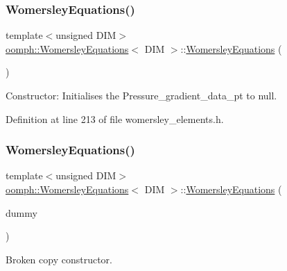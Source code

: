 \subsubsection{\texorpdfstring{Womersley\+Equations()}{WomersleyEquations()}\hspace{0.1cm}{\footnotesize\ttfamily [1/2]}}
{\footnotesize\ttfamily template$<$unsigned D\+IM$>$ \\
\hyperlink{classoomph_1_1WomersleyEquations}{oomph\+::\+Womersley\+Equations}$<$ D\+IM $>$\+::\hyperlink{classoomph_1_1WomersleyEquations}{Womersley\+Equations} (\begin{DoxyParamCaption}{ }\end{DoxyParamCaption})\hspace{0.3cm}{\ttfamily [inline]}}



Constructor\+: Initialises the Pressure\+\_\+gradient\+\_\+data\+\_\+pt to null. 



Definition at line 213 of file womersley\+\_\+elements.\+h.

\mbox{\label{classoomph_1_1WomersleyEquations_aed4568c1736e6027eb111d090b4cb5e9}} 
\subsubsection{\texorpdfstring{Womersley\+Equations()}{WomersleyEquations()}\hspace{0.1cm}{\footnotesize\ttfamily [2/2]}}
{\footnotesize\ttfamily template$<$unsigned D\+IM$>$ \\
\hyperlink{classoomph_1_1WomersleyEquations}{oomph\+::\+Womersley\+Equations}$<$ D\+IM $>$\+::\hyperlink{classoomph_1_1WomersleyEquations}{Womersley\+Equations} (\begin{DoxyParamCaption}\item[{const \hyperlink{classoomph_1_1WomersleyEquations}{Womersley\+Equations}$<$ D\+IM $>$ \&}]{dummy }\end{DoxyParamCaption})\hspace{0.3cm}{\ttfamily [inline]}}



Broken copy constructor. 



